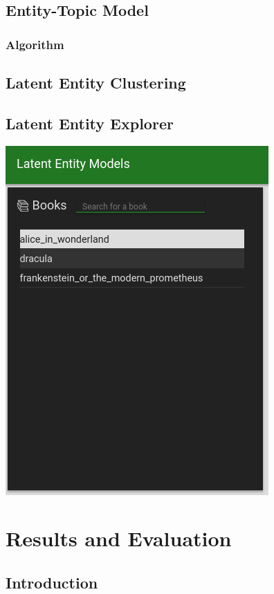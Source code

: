 \documentclass[10pt]{report}
\begin{document}
\section{Entity-Topic Model}

\subsection{Algorithm}

\section{Latent Entity Clustering }

\section{Latent Entity Explorer}

\includegraphics[scale=0.5]{book_list}\\


%
%
%
%
\chapter{Results and Evaluation}
\section{Introduction}
\end{document}
